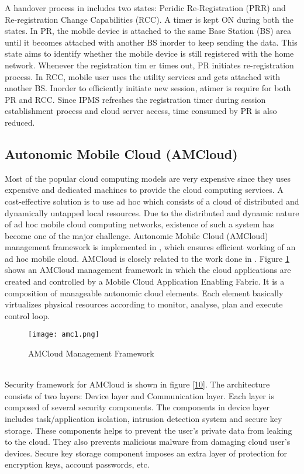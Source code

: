 \documentclass[10pt,a4paper,journal]{IEEEtran}
\begin{document}
\hspace*{2em} A handover process in \cite{3} includes two states: Peridic Re-Registration (PRR) and Re-registration Change Capabilities (RCC). A timer is kept ON during both the states. In PR, the mobile device is attached to the same Base Station (BS) area until it becomes attached with another BS inorder to keep sending the data. This state aims to identify whether the mobile device is still registered with the home network. Whenever the registration tim er times out, PR initiates re-registration process. In RCC, mobile user uses the utility services and gets attached with another BS. Inorder to efficiently initiate new session, atimer is require for both PR and RCC. Since IPMS refreshes the registration timer during session establishment process and cloud server access, time consumed by PR is also reduced.  
\subsection{Autonomic Mobile Cloud (AMCloud)}
 Most of the popular cloud computing models are very expensive since they uses expensive and dedicated machines to provide the cloud computing services. A cost-effective solution is to use ad hoc which consists of a cloud of distributed and dynamically untapped local resources. Due to the distributed and dynamic nature of ad hoc mobile cloud computing networks, existence of such a system has become one of the major challenge. Autonomic Mobile Cloud (AMCloud) management framework is implemented in \cite{1}, which ensures efficient working of an ad hoc mobile cloud. AMCloud is closely related to the work done in \cite{15}. Figure \ref{9} shows an AMCloud management framework in which the cloud applications are created and controlled by a Mobile Cloud Application Enabling Fabric. It is a composition of manageable autonomic cloud elements. Each element basically virtualizes physical resources according to monitor, analyse, plan and execute control loop.
\begin{figure}[htbp]
\centering
\texttt{[image: amc1.png]} 
\caption{AMCloud Management Framework \cite{1}}
\label{9}
\end{figure}\\
\hspace*{2em} Security framework for AMCloud is shown in figure \ref{10}. The architecture consists of two layers: Device layer and Communication layer. Each layer is composed of several security components. The components in device layer includes task/application isolation, intrusion detection system and secure key storage. These components helps to prevent the user's private data from leaking to the cloud. They also prevents malicious malware from damaging cloud user's devices. Secure key storage component imposes an extra layer of protection for encryption keys, account passwords, etc.
\end{document}

